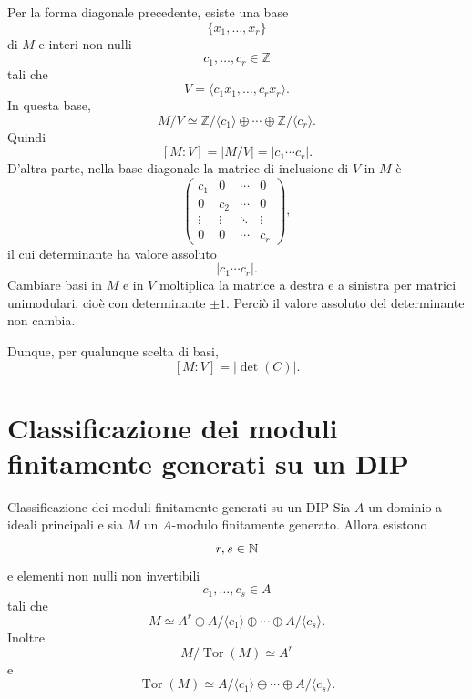 \documentclass[a4paper]{article}
\begin{document}
\begin{radioactive}
\begin{snippetproof}{}
    Per la forma diagonale precedente, esiste una base
    \[
        \{x_1,\ldots,x_r\}
    \]
    di \(M\) e interi non nulli
    \[
        c_1,\ldots,c_r\in\mathbb{Z}
    \]
    tali che
    \[
        V=\langle c_1x_1,\ldots,c_rx_r\rangle.
    \]
    In questa base,
    \[
        M/V
        \simeq
        \mathbb{Z}/\langle c_1 \rangle\oplus\cdots\oplus \mathbb{Z}/\langle c_r \rangle.
    \]
    Quindi
    \[
        [M:V]
        =
        |M/V|
        =
        |c_1\cdots c_r|.
    \]
    D'altra parte, nella base diagonale la matrice di inclusione di \(V\) in \(M\) è
    \[
        \begin{pmatrix}
            c_1 & 0 & \cdots & 0\\
            0 & c_2 & \cdots & 0\\
            \vdots & \vdots & \ddots & \vdots\\
            0 & 0 & \cdots & c_r
        \end{pmatrix},
    \]
    il cui determinante ha valore assoluto
    \[
        |c_1\cdots c_r|.
    \]
    Cambiare basi in \(M\) e in \(V\) moltiplica la matrice a destra e a sinistra per matrici unimodulari, cioè con determinante \(\pm 1\). Perciò il valore assoluto del determinante non cambia.

    Dunque, per qualunque scelta di basi,
    \[
        [M:V]=|\det(C)|.
    \]
\end{snippetproof}
\end{radioactive}

\section{Classificazione dei moduli finitamente generati su un DIP}

\begin{radioactive}
\begin{snippettheorem}{Classificazione dei moduli finitamente generati su un DIP}
    Sia \(A\) un dominio a ideali principali e sia \(M\) un \(A\)-modulo finitamente generato.
    Allora esistono
    \[
        r,s\in\mathbb{N}
    \]
    e elementi non nulli non invertibili
    \[
        c_1,\ldots,c_s\in A
    \]
    tali che
    \[
        M\simeq A^r\oplus A/\langle c_1 \rangle\oplus\cdots\oplus A/\langle c_s \rangle.
    \]
    Inoltre
    \[
        M/\operatorname{Tor}(M)\simeq A^r
    \]
    e
    \[
        \operatorname{Tor}(M)\simeq A/\langle c_1 \rangle\oplus\cdots\oplus A/\langle c_s \rangle.
    \]
\end{snippettheorem}
\end{radioactive}
\end{document}
